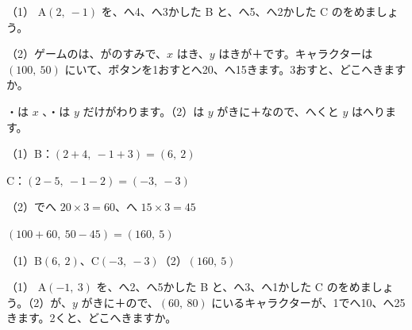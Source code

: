 \begin{reidai}[\R{点}{てん}を\R{動}{うご}かす]
（1） A$(2,\ -1)$ を、へ4、へ3かした B と、へ5、へ2かした C のをめましょう。\par
（2）ゲームのは、がのすみで、$x$ はき、$y$ はきが＋です。キャラクターは $(100,\ 50)$ にいて、ボタンを1おすとへ20、へ15きます。3おすと、どこへきますか。\par
\kangaekata {}・は $x$ 、・は $y$ だけがわります。（2）は $y$ がきに＋なので、へくと $y$ はへります。\par
\shiki（1）\nobreak B：$(2+4,\ -1+3)=(6,\ 2)$\par
\hspace*{2.6\zw}C：$(2-5,\ -1-2)=(-3,\ -3)$\par
\hspace*{2.6\zw}（2）でへ $20\times3=60$、へ $15\times3=45$\par
\hspace*{2.6\zw}$(100+60,\ 50-45)=(160,\ 5)$\par
\kotae（1）\nobreak B$(6,\ 2)$、C$(-3,\ -3)$\quad（2）\nobreak $(160,\ 5)$
\end{reidai}

\begin{jibun}
（1） A$(-1,\ 3)$ を、へ2、へ5かした B と、へ3、へ1かした C のをめましょう。（2）が、$y$ がきに＋ので、$(60,\ 80)$ にいるキャラクターが、1でへ10、へ25きます。2くと、どこへきますか。
\end{jibun}

